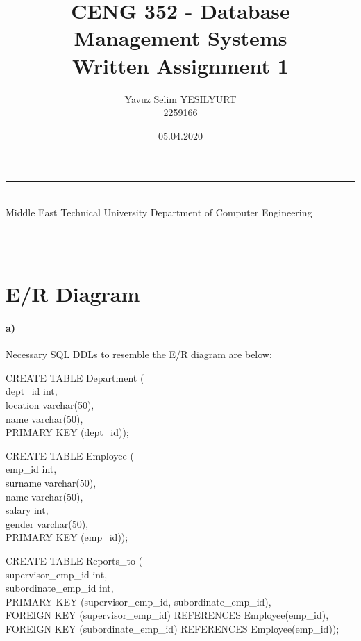 \documentclass[a4paper,12pt]{article}
\title{CENG 352 - Database Management Systems \\ Written Assignment 1}
\author{Yavuz Selim YESILYURT \\ 2259166} %
\date{05.04.2020}
\newcommand{\HRule}{\rule{\linewidth}{1mm}}
\begin{document}
\HRule\\
Middle East Technical University \hfill Department of Computer Engineering
{\let\newpage\relax\maketitle}
\HRule\\
\vspace{1cm}


\section{E/R Diagram \hfill}

\paragraph{a)} Necessary SQL DDLs to resemble the E/R diagram are below:  \\  

\begin{tcolorbox}
CREATE TABLE Department ( \\ 
	dept\_id int, \\ 
	location varchar(50), \\ 
	name varchar(50),\\
	PRIMARY KEY (dept\_id));
\end{tcolorbox}

\begin{tcolorbox}
CREATE TABLE Employee ( \\
	emp\_id int, \\
	surname varchar(50), \\
	name varchar(50), \\
	salary int, \\
	gender varchar(50), \\
	PRIMARY KEY (emp\_id));
\end{tcolorbox}

\newpage

\begin{tcolorbox}
CREATE TABLE Reports\_to ( \\
	supervisor\_emp\_id int, \\
	subordinate\_emp\_id int, \\
	PRIMARY KEY (supervisor\_emp\_id, subordinate\_emp\_id), \\
  	FOREIGN KEY (supervisor\_emp\_id) REFERENCES Employee(emp\_id), \\
  	FOREIGN KEY (subordinate\_emp\_id) REFERENCES Employee(emp\_id));
\end{tcolorbox}
\end{document}
